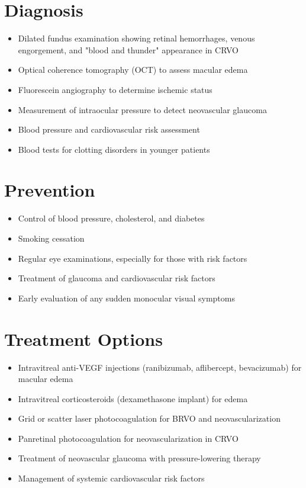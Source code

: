 \section{Diagnosis}
\begin{itemize}[noitemsep]
  \item Dilated fundus examination showing retinal hemorrhages, venous engorgement, and "blood and thunder" appearance in CRVO
  \item Optical coherence tomography (OCT) to assess macular edema
  \item Fluorescein angiography to determine ischemic status
  \item Measurement of intraocular pressure to detect neovascular glaucoma
  \item Blood pressure and cardiovascular risk assessment
  \item Blood tests for clotting disorders in younger patients
\end{itemize}
\section{Prevention}
\begin{itemize}[noitemsep]
  \item Control of blood pressure, cholesterol, and diabetes
  \item Smoking cessation
  \item Regular eye examinations, especially for those with risk factors
  \item Treatment of glaucoma and cardiovascular risk factors
  \item Early evaluation of any sudden monocular visual symptoms
\end{itemize}
\section{Treatment Options}
\begin{itemize}[noitemsep]
  \item Intravitreal anti-VEGF injections (ranibizumab, aflibercept, bevacizumab) for macular edema
  \item Intravitreal corticosteroids (dexamethasone implant) for edema
  \item Grid or scatter laser photocoagulation for BRVO and neovascularization
  \item Panretinal photocoagulation for neovascularization in CRVO
  \item Treatment of neovascular glaucoma with pressure-lowering therapy
  \item Management of systemic cardiovascular risk factors
\end{itemize}
